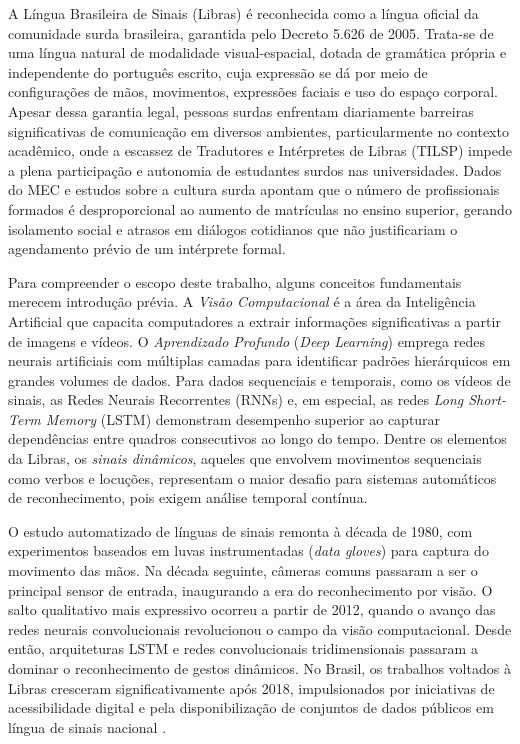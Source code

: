 
A Língua Brasileira de Sinais (Libras) é reconhecida como a língua oficial da comunidade surda brasileira, garantida pelo Decreto 5.626 de 2005. Trata-se de uma língua natural de modalidade visual-espacial, dotada de gramática própria e independente do português escrito, cuja expressão se dá por meio de configurações de mãos, movimentos, expressões faciais e uso do espaço corporal. Apesar dessa garantia legal, pessoas surdas enfrentam diariamente barreiras significativas de comunicação em diversos ambientes, particularmente no contexto acadêmico, onde a escassez de Tradutores e Intérpretes de Libras (TILSP) impede a plena participação e autonomia de estudantes surdos nas universidades. Dados do MEC e estudos sobre a cultura surda \cite{dockens:18} apontam que o número de profissionais formados é desproporcional ao aumento de matrículas no ensino superior, gerando isolamento social e atrasos em diálogos cotidianos que não justificariam o agendamento prévio de um intérprete formal.

Para compreender o escopo deste trabalho, alguns conceitos fundamentais merecem introdução prévia. A \textit{Visão Computacional} é a área da Inteligência Artificial que capacita computadores a extrair informações significativas a partir de imagens e vídeos. O \textit{Aprendizado Profundo} (\textit{Deep Learning}) emprega redes neurais artificiais com múltiplas camadas para identificar padrões hierárquicos em grandes volumes de dados. Para dados sequenciais e temporais, como os vídeos de sinais, as Redes Neurais Recorrentes (RNNs) e, em especial, as redes \textit{Long Short-Term Memory} (LSTM) demonstram desempenho superior ao capturar dependências entre quadros consecutivos ao longo do tempo. Dentre os elementos da Libras, os \textit{sinais dinâmicos}, aqueles que envolvem movimentos sequenciais como verbos e locuções, representam o maior desafio para sistemas automáticos de reconhecimento, pois exigem análise temporal contínua.

O estudo automatizado de línguas de sinais remonta à década de 1980, com experimentos baseados em luvas instrumentadas (\textit{data gloves}) para captura do movimento das mãos. Na década seguinte, câmeras comuns passaram a ser o principal sensor de entrada, inaugurando a era do reconhecimento por visão. O salto qualitativo mais expressivo ocorreu a partir de 2012, quando o avanço das redes neurais convolucionais revolucionou o campo da visão computacional. Desde então, arquiteturas LSTM e redes convolucionais tridimensionais passaram a dominar o reconhecimento de gestos dinâmicos. No Brasil, os trabalhos voltados à Libras cresceram significativamente após 2018, impulsionados por iniciativas de acessibilidade digital e pela disponibilização de conjuntos de dados públicos em língua de sinais nacional \cite{dockens:18}.

